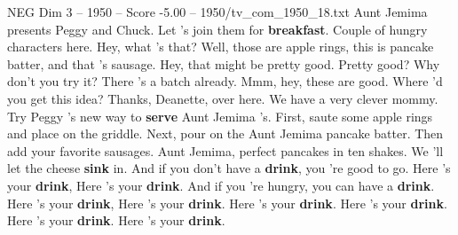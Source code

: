 \begin{textsample}{NEG Dim 3 – 1950 – Score -5.00 – 1950/tv\_com\_1950\_18.txt}  \label{ex:f3_neg_082}
Aunt Jemima presents Peggy and Chuck.
Let 's join them for \textbf{breakfast}.
Couple of hungry characters here.
Hey, what 's that?
Well, those are apple rings, this is pancake batter, and that 's sausage.
Hey, that might be pretty good.
Pretty good?
Why don't you try it?
There 's a batch already.
Mmm, hey, these are good.
Where 'd you get this idea?
Thanks, Deanette, over here.
We have a very clever mommy.
Try Peggy 's new way to \textbf{serve} Aunt Jemima 's.
First, saute some apple rings and place on the griddle.
Next, pour on the Aunt Jemima pancake batter.
Then add your favorite sausages.
Aunt Jemima, perfect pancakes in ten shakes.
We 'll let the cheese \textbf{sink} in.
And if you don't have a \textbf{drink}, you 're good to go.
Here 's your \textbf{drink}, Here 's your \textbf{drink}.
And if you 're hungry, you can have a \textbf{drink}.
Here 's your \textbf{drink}, Here 's your \textbf{drink}.
Here 's your \textbf{drink}.
Here 's your \textbf{drink}.
Here 's your \textbf{drink}.
Here 's your \textbf{drink}.

\end{textsample}
